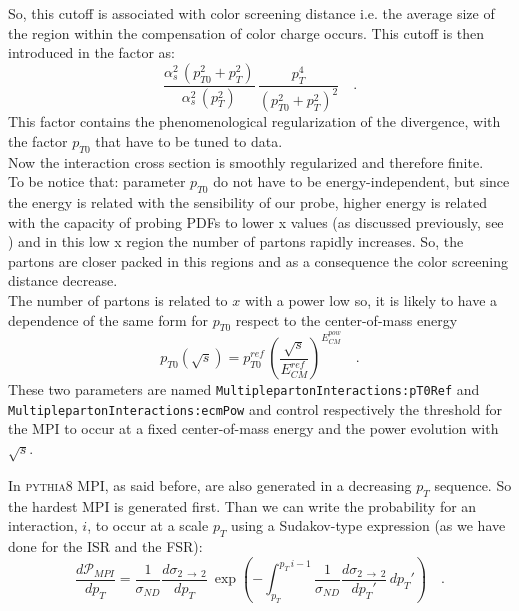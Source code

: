 \noindent So, this cutoff is associated with color screening distance i.e. the average size of the region within the  compensation of color charge occurs.
This cutoff is then introduced in the factor as:
\begin{equation}
	\frac{\alpha_s^2\,(p_{T0}^2+p_{T}^2)}{\alpha_s^2\,(p_T^2)}\,\frac{p_T^4}{(p_{T0}^2+p_T^2)^2}\quad .
\end{equation}
This factor contains the phenomenological regularization of the divergence, with the factor $p_{T0}$ that have to be tuned to data. 
\\
Now the interaction cross section is smoothly regularized and therefore finite.
\\
To be notice that: parameter $p_{T0}$ do not have to be energy-independent, but since the energy is related with the sensibility of our probe, higher energy is related with the capacity of probing PDFs to lower x values (as discussed previously, see ) and in this low x region the number of partons rapidly increases. So, the partons are closer packed in this regions and as a consequence the color screening distance decrease.
\\
The number of partons is related to $x$ with a power low so, it is likely to have a dependence of the same form for $p_{T0}$ respect to the center-of-mass energy
\begin{equation}
	p_{T0}(\sqrt{s})=p_{T0}^{ref} \,\left( \frac{\sqrt{s}}{E_{CM}^{ref}} \right)^{E_{CM}^{pow}}\quad .
\end{equation}
These two parameters are named \texttt{MultiplepartonInteractions:}\-\texttt{pT0Ref} and \texttt{Mul}\-\texttt{tiple}\-\texttt{partonInteractions:}\-\texttt{ecmPow} and control respectively the threshold for the MPI to occur at a fixed center-of-mass energy and the power evolution with $\sqrt{s}$. 


In \textsc{pythia}8 MPI, as said before, are also generated in a decreasing $p_T$ sequence. So the hardest MPI is generated first. Than we can write the probability for an interaction, $i$, to occur at a scale $p_T$ using a Sudakov-type expression (as we have done for the ISR and the FSR):
\begin{equation}
	\frac{d\mathcal{P}_{MPI}}{dp_T}=\frac{1}{\sigma_{ND}}\frac{d\sigma_{2\,\rightarrow\,2}}{dp_T}\ \exp\left( -\displaystyle\int_{p_T}^{p_T\,i-1} \frac{1}{\sigma_{ND}}\frac{d\sigma_{2\,\rightarrow\,2}}{dp_T'}\,dp_T' \right)\quad .
\end{equation}

